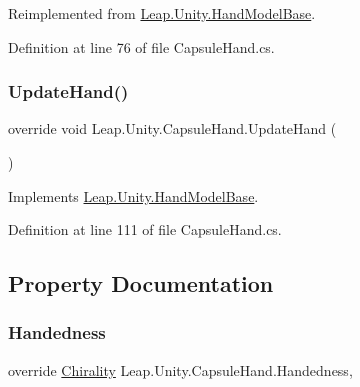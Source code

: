 Reimplemented from \mbox{\hyperlink{class_leap_1_1_unity_1_1_hand_model_base_acd4789523584dd7d240e1d426b4d321c}{Leap.\+Unity.\+Hand\+Model\+Base}}.



Definition at line 76 of file Capsule\+Hand.\+cs.

\mbox{\label{class_leap_1_1_unity_1_1_capsule_hand_a4a90f86a17e589ea462e29d99a2a51f9}} 
\subsubsection{\texorpdfstring{UpdateHand()}{UpdateHand()}}
{\footnotesize\ttfamily override void Leap.\+Unity.\+Capsule\+Hand.\+Update\+Hand (\begin{DoxyParamCaption}{ }\end{DoxyParamCaption})\hspace{0.3cm}{\ttfamily [virtual]}}



Implements \mbox{\hyperlink{class_leap_1_1_unity_1_1_hand_model_base_ae80b6c96322d078f01aacc02639d9dd0}{Leap.\+Unity.\+Hand\+Model\+Base}}.



Definition at line 111 of file Capsule\+Hand.\+cs.



\subsection{Property Documentation}
\mbox{\label{class_leap_1_1_unity_1_1_capsule_hand_a26d25d13c4d57f4425be3d7e771e1c93}} 
\subsubsection{\texorpdfstring{Handedness}{Handedness}}
{\footnotesize\ttfamily override \mbox{\hyperlink{namespace_leap_1_1_unity_a4d15adcf20ba121b2cd9c07f503b606f}{Chirality}} Leap.\+Unity.\+Capsule\+Hand.\+Handedness\hspace{0.3cm}{\ttfamily [get]}, {\ttfamily [set]}}



